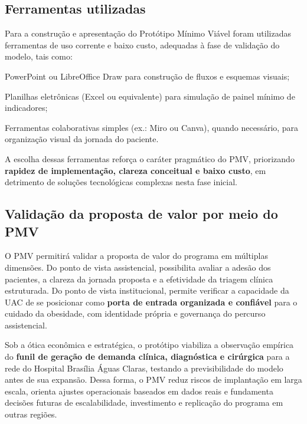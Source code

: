 \documentclass[12pt]{article}
\begin{document}
\subsection{Ferramentas utilizadas}
\label{sec:orgba8ffce}

Para a construção e apresentação do Protótipo Mínimo Viável foram utilizadas ferramentas de uso corrente e baixo custo, adequadas à fase de validação do modelo, tais como:
\begin{hleveltwo}
\item PowerPoint ou LibreOffice Draw para construção de fluxos e esquemas visuais;
\item Planilhas eletrônicas (Excel ou equivalente) para simulação de painel mínimo de indicadores;
\item Ferramentas colaborativas simples (ex.: Miro ou Canva), quando necessário, para organização visual da jornada do paciente.
\end{hleveltwo}

A escolha dessas ferramentas reforça o caráter pragmático do PMV, priorizando \textbf{\textbf{rapidez de implementação, clareza conceitual e baixo custo}}, em detrimento de soluções tecnológicas complexas nesta fase inicial.

\subsection{Validação da proposta de valor por meio do PMV}
\label{sec:orga917eb4}

O PMV permitirá validar a proposta de valor do programa em múltiplas dimensões. Do ponto de vista assistencial, possibilita avaliar a adesão dos pacientes, a clareza da jornada proposta e a efetividade da triagem clínica estruturada. Do ponto de vista institucional, permite verificar a capacidade da UAC de se posicionar como \textbf{\textbf{porta de entrada organizada e confiável}} para o cuidado da obesidade, com identidade própria e governança do percurso assistencial.

Sob a ótica econômica e estratégica, o protótipo viabiliza a observação empírica do \textbf{\textbf{funil de geração de demanda clínica, diagnóstica e cirúrgica}} para a rede do Hospital Brasília Águas Claras, testando a previsibilidade do modelo antes de sua expansão. Dessa forma, o PMV reduz riscos de implantação em larga escala, orienta ajustes operacionais baseados em dados reais e fundamenta decisões futuras de escalabilidade, investimento e replicação do programa em outras regiões.
\end{document}
